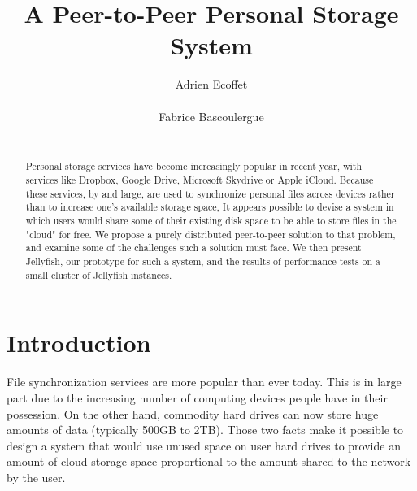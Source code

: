 \documentclass{acm_}
\begin{document}
\title{A Peer-to-Peer Personal Storage System}
\subtitle{}



\author{
\alignauthor
Adrien Ecoffet\\
       \\
\alignauthor
Fabrice Bascoulergue\\
       \\
}

\maketitle
\begin{abstract}
Personal storage services have become increasingly popular in recent year, with services like Dropbox, Google Drive, Microsoft Skydrive or Apple iCloud\cite{dropbox, drive, skydrive, icloud}. Because these services, by and large, are used to synchronize personal files across devices rather than to increase one's available storage space, It appears possible to devise a system in which users would share some of their existing disk space to be able to store files in the "cloud" for free. We propose a purely distributed peer-to-peer solution to that problem, and examine some of the challenges such a solution must face. We then present Jellyfish, our prototype for such a system, and the results of performance tests on a small cluster of Jellyfish instances.
\end{abstract}

\section{Introduction}

File synchronization services are more popular than ever today. This is in large part due to the increasing number of computing devices people have in their possession. On the other hand, commodity hard drives can now store huge amounts of data (typically 500GB to 2TB). Those two facts make it possible to design a system that would use unused space on user hard drives to provide an amount of cloud storage space proportional to the amount shared to the network by the user. 
\end{document}
